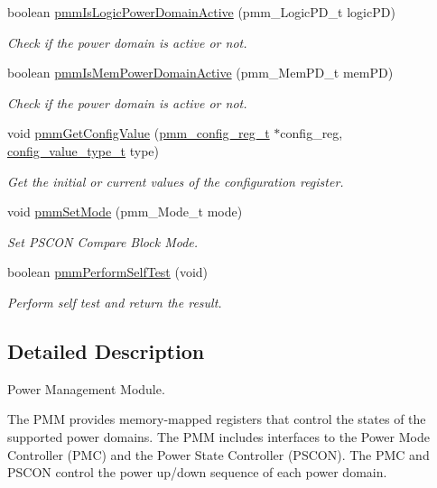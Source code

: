 \begin{DoxyCompactItemize}
boolean \mbox{\hyperlink{group__PMM_ga9a7b3cc1f08a5e0a0e1c39f53f8ea709}{pmm\+Is\+Logic\+Power\+Domain\+Active}} (pmm\+\_\+\+Logic\+P\+D\+\_\+t logic\+PD)
\begin{DoxyCompactList}\small\item\em Check if the power domain is active or not. \end{DoxyCompactList}\item 
boolean \mbox{\hyperlink{group__PMM_gad92e152a45b5bfa862b930273264f9be}{pmm\+Is\+Mem\+Power\+Domain\+Active}} (pmm\+\_\+\+Mem\+P\+D\+\_\+t mem\+PD)
\begin{DoxyCompactList}\small\item\em Check if the power domain is active or not. \end{DoxyCompactList}\item 
void \mbox{\hyperlink{group__PMM_gaa2d72c03373521038be734834fb230bb}{pmm\+Get\+Config\+Value}} (\mbox{\hyperlink{structpmm__config__reg}{pmm\+\_\+config\+\_\+reg\+\_\+t}} $\ast$config\+\_\+reg, \mbox{\hyperlink{sys__common_8h_a9daf9a5992391b058477d28d107ee5e2}{config\+\_\+value\+\_\+type\+\_\+t}} type)
\begin{DoxyCompactList}\small\item\em Get the initial or current values of the configuration register. \end{DoxyCompactList}\item 
void \mbox{\hyperlink{group__PMM_gafd3767acd1dd35ef877091fe303b08b6}{pmm\+Set\+Mode}} (pmm\+\_\+\+Mode\+\_\+t mode)
\begin{DoxyCompactList}\small\item\em Set P\+S\+C\+ON Compare Block Mode. \end{DoxyCompactList}\item 
boolean \mbox{\hyperlink{group__PMM_ga0a27f5db51b603a069b61e2fa149d81b}{pmm\+Perform\+Self\+Test}} (void)
\begin{DoxyCompactList}\small\item\em Perform self test and return the result. \end{DoxyCompactList}\end{DoxyCompactItemize}


\subsection{Detailed Description}
Power Management Module. 

The P\+MM provides memory-\/mapped registers that control the states of the supported power domains. The P\+MM includes interfaces to the Power Mode Controller (P\+MC) and the Power State Controller (P\+S\+C\+ON). The P\+MC and P\+S\+C\+ON control the power up/down sequence of each power domain.

